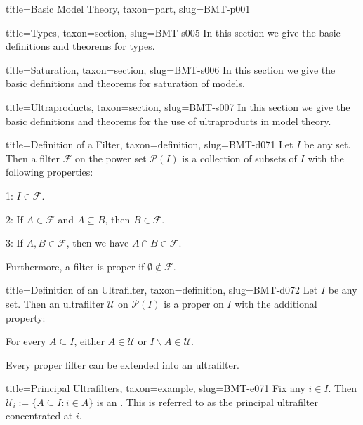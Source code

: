 \documentclass[a4paper]{article}
\begin{document}
\begin{tree}{title={Basic Model Theory}, taxon={part}, slug={BMT-p001}}
  
  
\begin{tree}{title={Types}, taxon={section}, slug={BMT-s005}}
In this section we give the basic definitions and theorems for types.
\end{tree}


  
  
\begin{tree}{title={Saturation}, taxon={section}, slug={BMT-s006}}
In this section we give the basic definitions and theorems for saturation of models.
\end{tree}


  
  
\begin{tree}{title={Ultraproducts}, taxon={section}, slug={BMT-s007}}
In this section we give the basic definitions and theorems for the use of ultraproducts in model theory.
\begin{tree}{title={Definition of a Filter}, taxon={definition}, slug={BMT-d071}}
Let \(I\) be any set. Then a filter \(\mathcal {F}\) on the power set \(\mathcal {P}(I)\) is a collection of subsets of \(I\) with the following properties:\par{1: \(I \in \mathcal {F}\).}\par{2: If \(A \in   \mathcal {F}\) and \(A \subseteq  B\), then \(B \in   \mathcal {F}\).}\par{3: If \(A,B  \in   \mathcal {F}\), then we have \(A \cap  B \in   \mathcal {F}\).}\par{Furthermore, a filter is proper if \(\emptyset \notin \mathcal {F}\).}
\end{tree}

\begin{tree}{title={Definition of an Ultrafilter}, taxon={definition}, slug={BMT-d072}}
Let \(I\) be any set. Then an ultrafilter \(\mathcal {U}\) on \(\mathcal {P}(I)\) is a proper  on \(I\) with the additional property:\par{For every \(A \subseteq  I\), either \(A \in \mathcal {U}\) or \(I \backslash  A \in \mathcal {U}\).}\par{Every proper filter can be extended into an ultrafilter.}
\end{tree}

\begin{tree}{title={Principal Ultrafilters}, taxon={example}, slug={BMT-e071}}
Fix any \(i \in  I\). Then \(\mathcal {U}_i :=  \{ A \subseteq  I: i \in  A \}\) is an . This is referred to as the principal ultrafilter concentrated at \(i\).
\end{tree}


\end{tree}
\end{tree}
\end{document}

